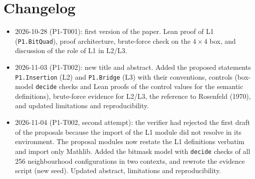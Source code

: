 \documentclass[11pt]{article}
\theoremstyle{definition}
\theoremstyle{remark}
\begin{document}
\section*{Changelog}
\begin{itemize}
\item 2026-10-28 (P1-T001): first version of the paper. Lean proof of L1
  (\texttt{P1.BitQuad}), proof architecture, brute-force check on the
  $4\times4$ box, and discussion of the role of L1 in L2/L3.
\item 2026-11-03 (P1-T002): new title and abstract. Added the proposed
  statements \texttt{P1.Insertion} (L2) and \texttt{P1.Bridge} (L3) with their
  conventions, controls (box-model \texttt{decide} checks and Lean proofs of the
  control values for the semantic definitions), brute-force evidence for L2/L3,
  the reference to Rosenfeld (1970), and updated limitations and reproducibility.
\item 2026-11-04 (P1-T002, second attempt): the verifier had rejected the first
  draft of the proposals because the import of the L1 module did not resolve in its
  environment. The proposal modules now restate the L1 definitions verbatim and
  import only Mathlib. Added the bitmask model with \texttt{decide} checks of all
  256 neighbourhood configurations in two contexts, and rewrote the evidence
  script (new seed). Updated abstract, limitations and reproducibility.
\end{itemize}



\end{document}
